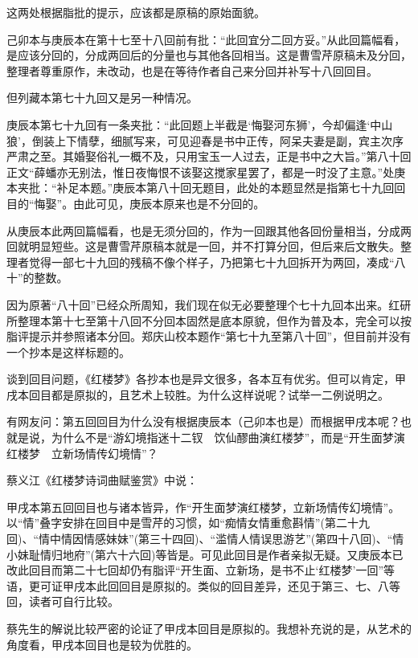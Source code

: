 这两处根据脂批的提示，应该都是原稿的原始面貌。

己卯本与庚辰本在第十七至十八回前有批：“此回宜分二回方妥。”从此回篇幅看，是应该分回的，分成两回后的分量也与其他各回相当。这是曹雪芹原稿未及分回，整理者尊重原作，未改动，也是在等待作者自己来分回并补写十八回回目。

但列藏本第七十九回又是另一种情况。

庚辰本第七十九回有一条夹批：“此回题上半截是‘悔娶河东狮’，今却偏逢‘中山狼’，倒装上下情孽，细腻写来，可见迎春是书中正传，阿呆夫妻是副，宾主次序严肃之至。其婚娶俗礼一概不及，只用宝玉一人过去，正是书中之大旨。”第八十回正文“薛蟠亦无别法，惟日夜悔恨不该娶这搅家星罢了，都是一时没了主意。”处庚本夹批：“补足本题。”庚辰本第八十回无题目，此处的本题显然是指第七十九回回目的“悔娶”。由此可见，庚辰本原来也是不分回的。

从庚辰本此两回篇幅看，也是无须分回的，作为一回跟其他各回份量相当，分成两回就明显短些。这是曹雪芹原稿本就是一回，并不打算分回，但后来后文散失。整理者觉得一部七十九回的残稿不像个样子，乃把第七十九回拆开为两回，凑成“八十”的整数。

因为原著“八十回”已经众所周知，我们现在似无必要整理个七十九回本出来。红研所整理本第十七至第十八回不分回本固然是底本原貌，但作为普及本，完全可以按脂评提示并参照诸本分回。郑庆山校本题作“第七十九至第八十回”，但目前并没有一个抄本是这样标题的。

{{}}

谈到回目问题，《红楼梦》各抄本也是异文很多，各本互有优劣。但可以肯定，甲戌本回目都是原拟的，且艺术上较胜。为什么这样说呢？试举一二例说明之。

有网友问：第五回回目为什么没有根据庚辰本（己卯本也是）而根据甲戌本呢？也就是说，为什么不是“游幻境指迷十二钗　饮仙醪曲演红楼梦”，而是“开生面梦演红楼梦　立新场情传幻境情”？

蔡义江《红楼梦诗词曲赋鉴赏》中说：

甲戌本第五回回目也与诸本皆异，作“开生面梦演红楼梦，立新场情传幻境情”。以“情”叠字安排在回目中是雪芹的习惯，如“痴情女情重愈斟情”(第二十九回)、“情中情因情感妹妹”(第三十四回)、“滥情人情误思游艺”(第四十八回)、“情小妹耻情归地府”(第六十六回)等皆是。可见此回目是作者亲拟无疑。又庚辰本已改此回目而第二十七回却仍有脂评“开生面、立新场，是书不止‘红楼梦’一回”等语，更可证甲戌本此回回目是原拟的。类似的回目差异，还见于第三、七、八等回，读者可自行比较。

蔡先生的解说比较严密的论证了甲戌本回目是原拟的。我想补充说的是，从艺术的角度看，甲戌本回目也是较为优胜的。

